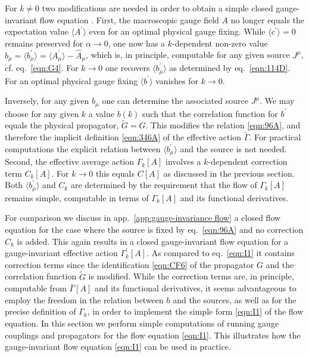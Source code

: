 \documentclass[twocolumn,aps,prd,amsmath,amssymb,preprintnumbers,longbibliography]{revtex4-1}
\numberwithin{equation}{section}
\begin{document}
For $k \neq 0$ two modifications are needed in order to obtain a simple closed gauge-invariant flow equation \cite{CWGIF}. First, the macroscopic gauge field $A$ no longer equals the expectation value $\langle A^\prime\rangle$ even for an optimal physical gauge fixing. While $\langle c^\prime\rangle = 0$ remains preserved for $\alpha \to 0$, one now has a $k$-dependent non-zero value $b_\mu = \langle b_\mu^\prime\rangle = \langle A_\mu^\prime\rangle - \hat{A}_\mu$, which is, in principle, computable for any given source $J^\mu$, cf. eq.~\eqref{eqn:G4}. For $k \to 0$ one recovers $\langle b_\mu^\prime\rangle$ as determined by eq.~\eqref{eqn:114D}. For an optimal physical gauge fixing $\langle b^\prime\rangle$ vanishes for $k \to 0$.

Inversely, for any given $b_\mu$ one can determine the associated source $J^\mu$. We may choose for any given $k$ a value $b(k)$ such that the correlation function for $b^\prime$ equals the physical propagator, $\tilde{G} = G$. This modifies the relation \eqref{eqn:96A}, and therefore the implicit definition \eqref{eqn:346A} of the effective action $\tilde\Gamma$. For practical computations the explicit relation between $\langle b_\mu^\prime\rangle$ and the source is not needed. Second, the effective average action $\Gamma_k[A]$ involves a $k$-dependent correction term $C_k[A]$. For $k \to 0$ this equals $C[A]$ as discussed in the previous section. Both $\langle b_\mu^\prime\rangle$ and $C_k$ are determined by the requirement that the flow of $\Gamma_k[A]$ remains simple, computable in terms of $\Gamma_k[A]$ and its functional derivatives.

For comparison we discuss in app.~\ref{app:gauge-invariance flow} a closed flow equation for the case where the source is fixed by eq.~\eqref{eqn:96A} and no correction $C_k$ is added. This again results in a closed gauge-invariant flow equation for a gauge-invariant effective action $\Gamma_k^\prime[A]$. As compared to eq.~\eqref{eqn:I1} it contains correction terms since the identification \eqref{eqn:CF6} of the propagator $G$ and the correlation function $\tilde{G}$ is modified. While the correction terms are, in principle, computable from $\bar\Gamma[A]$ and its functional derivatives, it seems advantageous to employ the freedom in the relation between $b$ and the sources, as well as for the precise definition of $\Gamma_k$, in order to implement the simple form \eqref{eqn:I1} of the flow equation. In this section we perform simple computations of running gauge couplings and propagators for the flow equation \eqref{eqn:I1}. This illustrates how the gauge-invariant flow equation \eqref{eqn:I1} can be used in practice.
\end{document}
